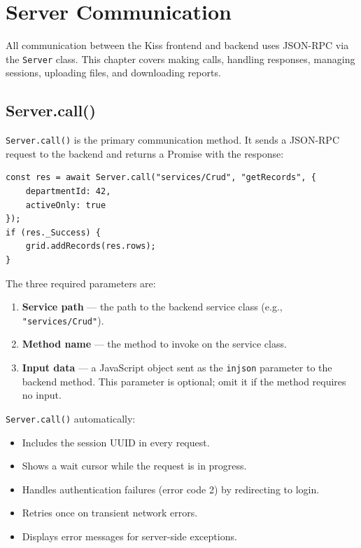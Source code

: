 \chapter{Server Communication}
\label{ch:server-comm}

All communication between the Kiss frontend and backend uses JSON-RPC via the \texttt{Server} class.  This chapter covers making calls, handling responses, managing sessions, uploading files, and downloading reports.

\section{Server.call()}
\label{sec:sc-call}

\texttt{Server.call()} is the primary communication method.  It sends a JSON-RPC request to the backend and returns a Promise with the response:

\begin{lstlisting}[style=javascript]
const res = await Server.call("services/Crud", "getRecords", {
    departmentId: 42,
    activeOnly: true
});
if (res._Success) {
    grid.addRecords(res.rows);
}
\end{lstlisting}

\noindent
The three required parameters are:

\begin{enumerate}
  \item \textbf{Service path} --- the path to the backend service class (e.g., \texttt{"services/Crud"}).
  \item \textbf{Method name} --- the method to invoke on the service class.
  \item \textbf{Input data} --- a JavaScript object sent as the \texttt{injson} parameter to the backend method.  This parameter is optional; omit it if the method requires no input.
\end{enumerate}

\noindent
\texttt{Server.call()} automatically:
\begin{itemize}
  \item Includes the session UUID in every request.
  \item Shows a wait cursor while the request is in progress.
  \item Handles authentication failures (error code 2) by redirecting to login.
  \item Retries once on transient network errors.
  \item Displays error messages for server-side exceptions.
\end{itemize}

